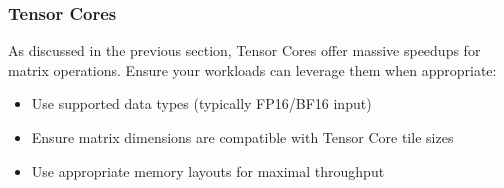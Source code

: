 \subsubsection{Tensor Cores}

As discussed in the previous section, Tensor Cores offer massive speedups for matrix operations. Ensure your workloads can leverage them when appropriate:

\begin{itemize}
    \item Use supported data types (typically FP16/BF16 input)
    \item Ensure matrix dimensions are compatible with Tensor Core tile sizes
    \item Use appropriate memory layouts for maximal throughput
\end{itemize}


